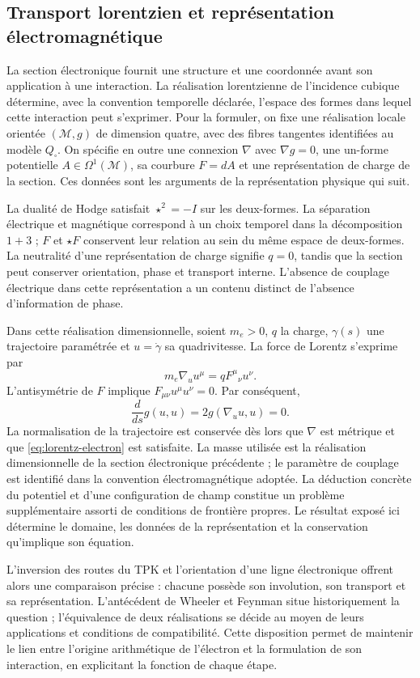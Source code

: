 \subsection{Transport lorentzien et représentation électromagnétique}

La section électronique fournit une structure et une coordonnée
avant son application à une interaction. La réalisation lorentzienne
de l'incidence cubique détermine, avec la convention temporelle déclarée,
l'espace des formes dans lequel cette interaction peut s'exprimer.
Pour la formuler, on fixe une réalisation locale orientée \((\mathcal M,g)\)
de dimension quatre, avec des fibres tangentes identifiées au modèle
\(Q_\square\). On spécifie en outre une connexion \(\nabla\) avec
\(\nabla g=0\), une un-forme potentielle \(A\in\Omega^1(\mathcal M)\),
sa courbure \(F=dA\) et une représentation de charge de la section.
Ces données sont les arguments de la représentation physique qui suit.

La dualité de Hodge satisfait \(\star^2=-I\) sur les deux-formes. La séparation électrique et magnétique correspond à un choix temporel dans la décomposition \(1+3\) ; \(F\) et \(\star F\) conservent leur relation au sein du même espace de deux-formes. La neutralité d'une représentation de charge signifie \(q=0\), tandis que la section peut conserver orientation, phase et transport interne. L'absence de couplage électrique dans cette représentation a un contenu distinct de l'absence d'information de phase.

Dans cette réalisation dimensionnelle, soient \(m_e>0\), \(q\) la charge,
\(\gamma(s)\) une trajectoire paramétrée et \(u=\dot\gamma\)
sa quadrivitesse. La force de Lorentz s'exprime par
\begin{equation}
 m_e\nabla_u u^\mu=qF^\mu{}_{\nu}u^\nu.
 \label{eq:lorentz-electron}
\end{equation}
L'antisymétrie de \(F\) implique
\(F_{\mu\nu}u^\mu u^\nu=0\). Par conséquent,
\[
 \frac{d}{ds}g(u,u)=2g(\nabla_u u,u)=0.
\]
La normalisation de la trajectoire est conservée dès lors que \(\nabla\)
est métrique et que \eqref{eq:lorentz-electron} est satisfaite. La masse utilisée
est la réalisation dimensionnelle de la section électronique précédente ;
le paramètre de couplage est identifié dans la convention électromagnétique
adoptée. La déduction concrète du potentiel et d'une configuration
de champ constitue un problème supplémentaire assorti de conditions de frontière
propres. Le résultat exposé ici détermine le domaine, les données
de la représentation et la conservation qu'implique son équation.

L'inversion des routes du TPK et l'orientation d'une ligne électronique
offrent alors une comparaison précise : chacune possède son involution,
son transport et sa représentation. L'antécédent de Wheeler et Feynman
situe historiquement la question ; l'équivalence de deux réalisations
se décide au moyen de leurs applications et conditions de compatibilité.
Cette disposition permet de maintenir le lien entre l'origine arithmétique de l'électron
et la formulation de son interaction, en explicitant la fonction
de chaque étape.
